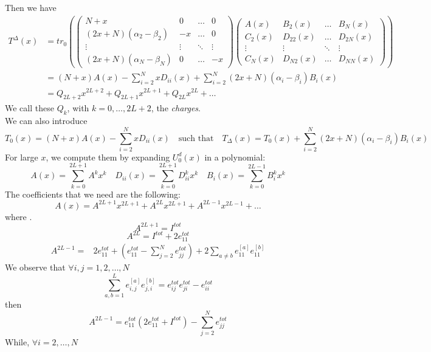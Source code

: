 \documentclass[11pt]{article}
\numberwithin{equation}{subsection}
\begin{document}
Then we have
\begin{equation}
	\begin{split}
	T^{\Delta}(x)&=tr_{0}\left(\begin{pmatrix}
		N+x&0&\ldots&0\\
		(2x+N)(\alpha_{2}-\beta_{2})&-x&\ldots&0\\
		\vdots&\vdots&\ddots&\vdots\\
		(2x+N)(\alpha_{N}-\beta_{N})&0&\ldots&-x
	\end{pmatrix}\begin{pmatrix}
	A(x)&B_{2}(x)&\ldots&B_{N}(x)\\
	C_{2}(x)&D_{22}(x)&\ldots&D_{2N}(x)\\
	\vdots&\vdots&\ddots&\vdots\\
	C_{N}(x)&D_{N2}(x)&\ldots&D_{NN}(x)
\end{pmatrix}\right)\\&=
(N+x)A(x)-\sum_{i=2}^{N}xD_{ii}(x)+\sum_{i=2}^{N}(2x+N)(\alpha_{i}-\beta_{i})B_{i}(x)\\&=
Q_{2L+2}x^{2L+2}+Q_{2L+1}x^{2L+1}+Q_{2L}x^{2L}+\ldots
\end{split}
\end{equation}
We call these $Q_{k}$, with $k=0,\ldots,2L+2$, the \textit{charges}. \\
We can also introduce 
\begin{equation}
	T_{0}(x)=(N+x)A(x)-\sum_{i=2}^{N}xD_{ii}(x)\quad\text{such that}\quad T_{\Delta}(x)=T_{0}(x)+\sum_{i=2}^{N}(2x+N)(\alpha_{i}-\beta_{i})B_{i}(x)
\end{equation}For large $x$, we compute them by expanding $U_{0}^{d}(x)$ in a polynomial: 
\begin{equation}
	A(x)=\sum_{k=0}^{2L+1}A^{k}x^{k}\quad D_{ii}(x)=\sum_{k=0}^{2L+1}D_{ii}^{k}x^{k}\quad B_{i}(x)=\sum_{k=0}^{2L-1}B_{i}^{k}x^{k}
\end{equation}
The coefficients that we need are the following:
\begin{equation}
	A(x)=A^{2L+1}x^{2L+1}+A^{2L}x^{2L+1}+A^{2L-1}x^{2L-1}+\ldots
\end{equation}
where .
\begin{equation}
	A^{2L+1}=I^{tot}
\end{equation}
\begin{equation}
	A^{2L}=I^{tot}+2e_{11}^{tot}
\end{equation}
\begin{equation}
	\begin{split}
		A^{2L-1}=&2e_{11}^{tot}+\left(e_{11}^{tot}-\sum_{j=2}^{N}e_{jj}^{tot}\right)+2\sum_{a\neq b}e_{11}^{[a]}e_{11}^{[b]}
	\end{split}
\end{equation}
We observe that $\forall i,j=1,2,\ldots,N$
\begin{equation}
	\sum_{a,b=1}^{L}e_{i,j}^{[a]}e_{j,i}^{[b]}=e_{ij}^{tot}e_{ji}^{tot}-e_{ii}^{tot}
\end{equation}
then 
\begin{equation}
	\boxed{A^{2L-1}=e_{11}^{tot}\left(2e_{11}^{tot}+I^{tot}\right)-\sum_{j=2}^{N}e_{jj}^{tot}}
\end{equation}
While, $\forall i=2,\ldots,N$
\end{document}
